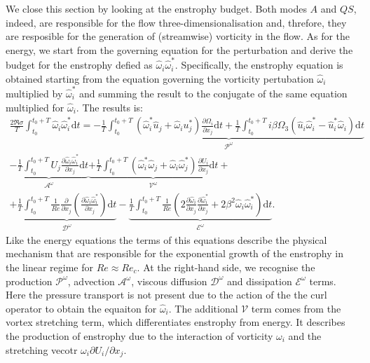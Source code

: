 \iffalse
We close this section by looking at the enstrophy budget. Both modes $A$ and $QS$, indeed, are responsible for the flow three-dimensionalisation and, threfore, they are resposible for the generation of (streamwise) vorticity in the flow. As for the energy, we start from the governing equation for the perturbation and derive the budget for the enstrophy defied as $\hat{\omega}_i \hat{\omega}_i^*$. Specifically, the enstrophy equation is obtained starting from the equation governing the vorticity pertubation $\hat{\omega}_i$ multiplied by $\hat{\omega}_i^*$ and summing the result to the conjugate of the same equation multiplied for $\hat{\omega}_i$. The results is:
%
\begin{equation}
  \begin{gathered}
  \frac{2 \Re{\sigma}}{T} \int_{t_0}^{t_0+T} \hat{\omega}_i \hat{\omega}_i^* \text{d}t =  
  \underbrace{
  - \frac{1}{T} \int_{t_0}^{t_0+T} \left( \hat{\omega}_i^* \hat{u}_j + \hat{\omega}_i u_j^* \right) \frac{\partial \Omega_i}{\partial x_j} \text{d}t
  + \frac{1}{T} \int_{t_0}^{t_0+T}    i \beta \Omega_3 \left( \hat{u}_i \hat{\omega}_{i}^* - \hat{u}_i^* \hat{\omega}_i \right)  \text{d} t}_{\mathcal{P}^\omega} \\
  \underbrace{  - \frac{1}{T} \int_{t_0}^{t_0+T} U_j \frac{\partial \hat{\omega}_i \hat{\omega}_i^* }{\partial x_j} \text{d} t }_{\mathcal{A}^\omega}
  \underbrace{
  + \frac{1}{T} \int_{t_0}^{t_0+T} \left( \hat{\omega}_i^* \hat{\omega}_j + \hat{\omega}_i \hat{\omega}_j^* \right) \frac{\partial U_i}{\partial x_j} \text{d} t }_{\mathcal{V}^\omega} + \\
  + 
  \underbrace{\frac{1}{T} \int_{t_0}^{t_0+T}    \frac{1}{Re} \frac{\partial}{\partial x_j} \left( \frac{\partial \hat{\omega}_i \hat{\omega}_i^*}{\partial x_j} \right) \text{d} t }_{\mathcal{D}^{\omega}} -
 \underbrace{ \frac{1}{T} \int_{t_0}^{t_0+T} \frac{1}{Re} \left( 2 \frac{\partial \hat{\omega}_i}{\partial x_j} \frac{\partial \hat{\omega}_i^*}{\partial x_j} + 2 \beta^2 \hat{\omega}_i \hat{\omega}_i^* \right) \text{d} t }_{\mathcal{E}^\omega}.
  \end{gathered}
\end{equation}
%
Like the energy equations the terms of this equations describe the physical mechanism that are responsible for the exponential growth of the enstrophy in the linear regime for $Re \approx Re_c$. At the right-hand side, we recognise the production $\mathcal{P}^\omega$, advection $\mathcal{A}^\omega$, viscous diffusion $\mathcal{D}^\omega$ and dissipation $\mathcal{E}^\omega$ terms. Here the pressure transport is not present due to the action of the the curl operator to obtain the equaiton for $\hat{\omega}_i$. The additional $\mathcal{V}$ term comes from the vortex stretching term, which differentiates enstrophy from energy. It describes the production of enstrophy due to the interaction of vorticity $\omega_i$ and the stretching vecotr $\omega_i \partial U_i/\partial x_j$.

